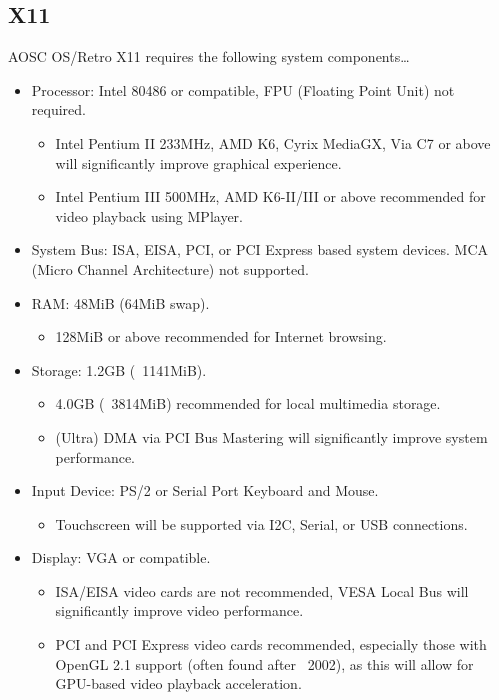     \subsection{X11}

    AOSC OS/Retro X11 requires the following system components\ldots

    \begin{itemize}
    \item Processor: Intel 80486 or compatible, FPU (Floating Point Unit) not required.
        \begin{itemize}
            \item Intel Pentium II 233MHz, AMD K6, Cyrix MediaGX, Via C7 or above will significantly improve graphical experience.
            \item Intel Pentium III 500MHz, AMD K6-II/III or above recommended for video playback using MPlayer.
        \end{itemize}
    \item System Bus: ISA, EISA, PCI, or PCI Express based system devices. MCA (Micro Channel Architecture) not supported.
    \item RAM: 48MiB (64MiB swap).
        \begin{itemize}
            \item 128MiB or above recommended for Internet browsing.
        \end{itemize}
    \item Storage: 1.2GB (~1141MiB).
        \begin{itemize}
            \item 4.0GB (~3814MiB) recommended for local multimedia storage.
            \item (Ultra) DMA via PCI Bus Mastering will significantly improve system performance.
        \end{itemize}
    \item Input Device: PS/2 or Serial Port Keyboard and Mouse.
        \begin{itemize}
            \item Touchscreen will be supported via I2C, Serial, or USB connections.
        \end{itemize}
    \item Display: VGA or compatible.
        \begin{itemize}
            \item ISA/EISA video cards are not recommended, VESA Local Bus will significantly improve video performance.
            \item PCI and PCI Express video cards recommended, especially those with OpenGL 2.1 support (often found after ~2002), as this will allow for GPU-based video playback acceleration.
        \end{itemize}
    \end{itemize}

